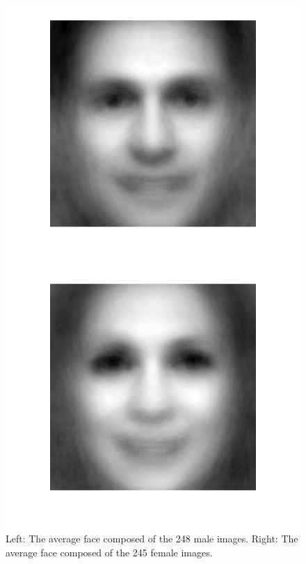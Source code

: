 \begin{figure}[ht]
    \centering
    \begin{minipage}{0.49\textwidth}
    \includegraphics[width=1\textwidth]{fig/henrikbruus.png}
    \end{minipage}
    \begin{minipage}{0.49\textwidth}
    \includegraphics[width=1\textwidth]{fig/henrikbruuskone.png}
    \end{minipage}
    \caption{Left: The average face composed of the 248 male images. Right: The average face composed of the 245 female images.}
    \label{fig:avgface}
\end{figure}

